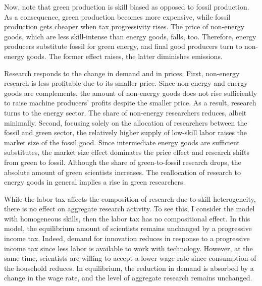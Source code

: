 
 Now, note that green production is skill biased as opposed to fossil production.
 As a  consequence, green production becomes more expensive, while fossil production gets cheaper when tax progressivity rises. The price of non-energy goods, which are less skill-intense than energy goods, falls, too. Therefore, energy producers substitute fossil for green energy, and final good producers turn to non-energy goods. The former effect raises, the latter diminishes emissions.
 
 
 Research responds to the change in demand and in prices. First, non-energy research is less profitable due to its smaller price. Since non-energy and energy goods are complements, the amount of non-energy goods does not rise sufficiently to raise machine producers' profits despite the smaller price. As a result, research turns to the energy sector. The share of non-energy researchers reduces, albeit minimally. %
 Second, focusing solely on the allocation of researchers between the fossil and green sector, the relatively higher supply of low-skill labor raises the market size of the fossil good. Since intermediate energy goods are sufficient substitutes, the market size effect dominates the price effect and research shifts from green to fossil.
 Although the share of green-to-fossil research drops, the absolute amount of green scientists increases. The reallocation of research to energy goods in general implies a rise in green researchers. 
 
 While the labor tax affects the composition of research due to skill heterogeneity, there is no effect on aggregate research activity. 
 To see this, I consider the model with homogeneous skills, then the labor tax has no compositional effect. In this model, the equilibrium amount of scientists remains unchanged by a progressive income tax. Indeed, demand for innovation reduces in response to a progressive income tax since less labor is available to work with technology. However, at the same time, scientists are willing to accept a lower wage rate since consumption of the household reduces. In equilibrium, the reduction in demand is absorbed by a change in the wage rate, and the level of aggregate research remains unchanged. 
 
